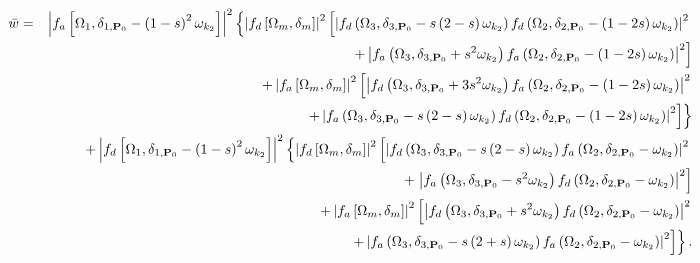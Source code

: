 \documentclass[twocolumn,showpacs,preprintnumbers]{revtex4}
\begin{document}
\begin{eqnarray}
\bar{w} &=&\left\vert f_{a}\left[ \Omega _{1},\delta _{1,\mathbf{P}%
_{0}}-\left( 1-s\right) ^{2}\omega _{k_{2}}\right] \right\vert ^{2}\left\{
\left\vert f_{d}\left[ \Omega _{m},\delta _{m}\right] \right\vert ^{2}\left[
\left\vert f_{d}\left( \Omega _{3},\delta _{3,\mathbf{P}_{0}}-s\left(
2-s\right) \omega _{k_{2}}\right) f_{d}\left( \Omega _{2},\delta _{2,\mathbf{%
P}_{0}}-\left( 1-2s\right) \omega _{k_{2}}\right) \right\vert ^{2}\right.
\right.  \notag \\
&&\left. +\left\vert f_{a}\left( \Omega _{3},\delta _{3,\mathbf{P}%
_{0}}+s^{2}\omega _{k_{2}}\right) f_{a}\left( \Omega _{2},\delta _{2,\mathbf{%
P}_{0}}-\left( 1-2s\right) \omega _{k_{2}}\right) \right\vert ^{2}\right] 
\notag \\
&&+\left\vert f_{a}\left[ \Omega _{m},\delta _{m}\right] \right\vert ^{2}%
\left[ \left\vert f_{d}\left( \Omega _{3},\delta _{3,\mathbf{P}%
_{0}}+3s^{2}\omega _{k_{2}}\right) f_{a}\left( \Omega _{2},\delta _{2,%
\mathbf{P}_{0}}-\left( 1-2s\right) \omega _{k_{2}}\right) \right\vert
^{2}\right.  \notag \\
&&\left. \left. +\left\vert f_{a}\left( \Omega _{3},\delta _{3,\mathbf{P}%
_{0}}-s\left( 2-s\right) \omega _{k_{2}}\right) f_{d}\left( \Omega
_{2},\delta _{2,\mathbf{P}_{0}}-\left( 1-2s\right) \omega _{k_{2}}\right)
\right\vert ^{2}\right] \right\}  \notag \\
&&+\left\vert f_{d}\left[ \Omega _{1},\delta _{1,\mathbf{P}_{0}}-\left(
1-s\right) ^{2}\omega _{k_{2}}\right] \right\vert ^{2}\left\{ \left\vert
f_{d}\left[ \Omega _{m},\delta _{m}\right] \right\vert ^{2}\left[ \left\vert
f_{d}\left( \Omega _{3},\delta _{3,\mathbf{P}_{0}}-s\left( 2-s\right) \omega
_{k_{2}}\right) f_{a}\left( \Omega _{2},\delta _{2,\mathbf{P}_{0}}-\omega
_{k_{2}}\right) \right\vert ^{2}\right. \right.  \notag \\
&&+\left. \left\vert f_{a}\left( \Omega _{3},\delta _{3,\mathbf{P}%
_{0}}-s^{2}\omega _{k_{2}}\right) f_{d}\left( \Omega _{2},\delta _{2,\mathbf{%
P}_{0}}-\omega _{k_{2}}\right) \right\vert ^{2}\right]  \notag \\
&&+\left\vert f_{a}\left[ \Omega _{m},\delta _{m}\right] \right\vert ^{2}%
\left[ \left\vert f_{d}\left( \Omega _{3},\delta _{3,\mathbf{P}%
_{0}}+s^{2}\omega _{k_{2}}\right) f_{d}\left( \Omega _{2},\delta _{2,\mathbf{%
P}_{0}}-\omega _{k_{2}}\right) \right\vert ^{2}\right.  \notag \\
&&\left. \left. +\left\vert f_{a}\left( \Omega _{3},\delta _{3,\mathbf{P}%
_{0}}-s\left( 2+s\right) \omega _{k_{2}}\right) f_{a}\left( \Omega
_{2},\delta _{2,\mathbf{P}_{0}}-\omega _{k_{2}}\right) \right\vert ^{2}%
\right] \right\} .  \label{a30}
\end{eqnarray}
\end{document}

